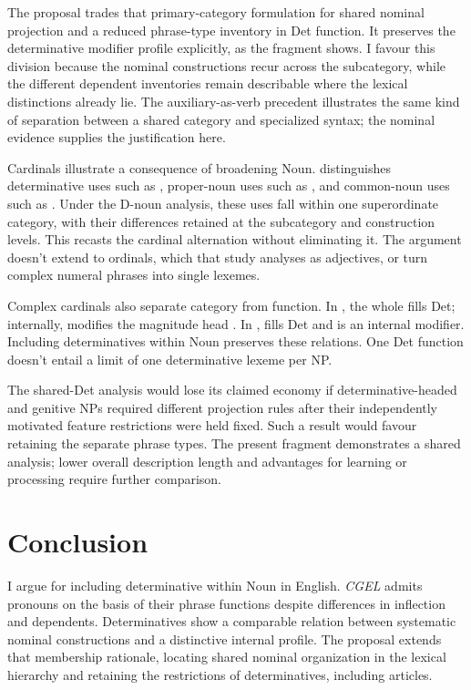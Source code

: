 \documentclass[12pt]{article}
\begin{document}
The proposal trades that primary-category formulation for shared nominal projection and a reduced phrase-type inventory in Det function. It preserves the determinative modifier profile explicitly, as the fragment shows. I favour this division because the nominal constructions recur across the subcategory, while the different dependent inventories remain describable where the lexical distinctions already lie. The auxiliary-as-verb precedent illustrates the same kind of separation between a shared category and specialized syntax; the nominal evidence supplies the justification here.

Cardinals illustrate a consequence of broadening Noun. \textcite{reynolds2026numerals} distinguishes determinative uses such as , proper-noun uses such as , and common-noun uses such as . Under the D-noun analysis, these uses fall within one superordinate category, with their differences retained at the subcategory and construction levels. This recasts the cardinal alternation without eliminating it. The argument doesn't extend to ordinals, which that study analyses as adjectives, or turn complex numeral phrases into single lexemes.

Complex cardinals also separate category from function. In , the whole  fills Det; internally,  modifies the magnitude head  \citep[§4]{reynolds2026numerals}. In ,  fills Det and  is an internal modifier. Including determinatives within Noun preserves these relations. One Det function doesn't entail a limit of one determinative lexeme per NP.

The shared-Det analysis would lose its claimed economy if determinative-headed and genitive NPs required different projection rules after their independently motivated feature restrictions were held fixed. Such a result would favour retaining the separate phrase types. The present fragment demonstrates a shared analysis; lower overall description length and advantages for learning or processing require further comparison.

\section{Conclusion}\label{sec:conclusion}

I argue for including determinative within Noun in English. \textit{CGEL} admits pronouns on the basis of their phrase functions despite differences in inflection and dependents. Determinatives show a comparable relation between systematic nominal constructions and a distinctive internal profile. The proposal extends that membership rationale, locating shared nominal organization in the lexical hierarchy and retaining the restrictions of determinatives, including articles.
\end{document}
